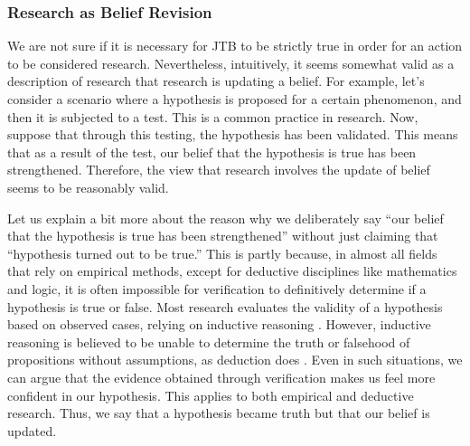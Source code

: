 \documentclass{book}
\begin{document}
\subsubsection{Research as Belief Revision}
We are not sure if it is necessary for JTB to be strictly true in order for an action to be considered research. Nevertheless, intuitively, it seems somewhat valid as a description of research that research is updating a belief. For example, let's consider a scenario where a hypothesis is proposed for a certain phenomenon, and then it is subjected to a test. This is a common practice in research. Now, suppose that through this testing, the hypothesis has been validated. This means that as a result of the test, our belief that the hypothesis is true has been strengthened. Therefore, the view that research involves the update of belief seems to be reasonably valid.


Let us explain a bit more about the reason why we deliberately say ``our belief that the hypothesis is true has been strengthened'' without just claiming that ``hypothesis turned out to be true.'' This is partly because, in almost all fields that rely on empirical methods, except for deductive disciplines like mathematics and logic, it is often impossible for verification to definitively determine if a hypothesis is true or false. Most research evaluates the validity of a hypothesis based on observed cases, relying on inductive reasoning \cite{sep-scientific-method}. However, inductive reasoning is believed to be unable to determine the truth or falsehood of propositions without assumptions, as deduction does \cite{sep-induction-problem}. Even in such situations, we can argue that the evidence obtained through verification makes us feel more confident in our hypothesis. This applies to both empirical and deductive research. Thus, we say that a hypothesis became truth but that our belief is updated.
\end{document}
